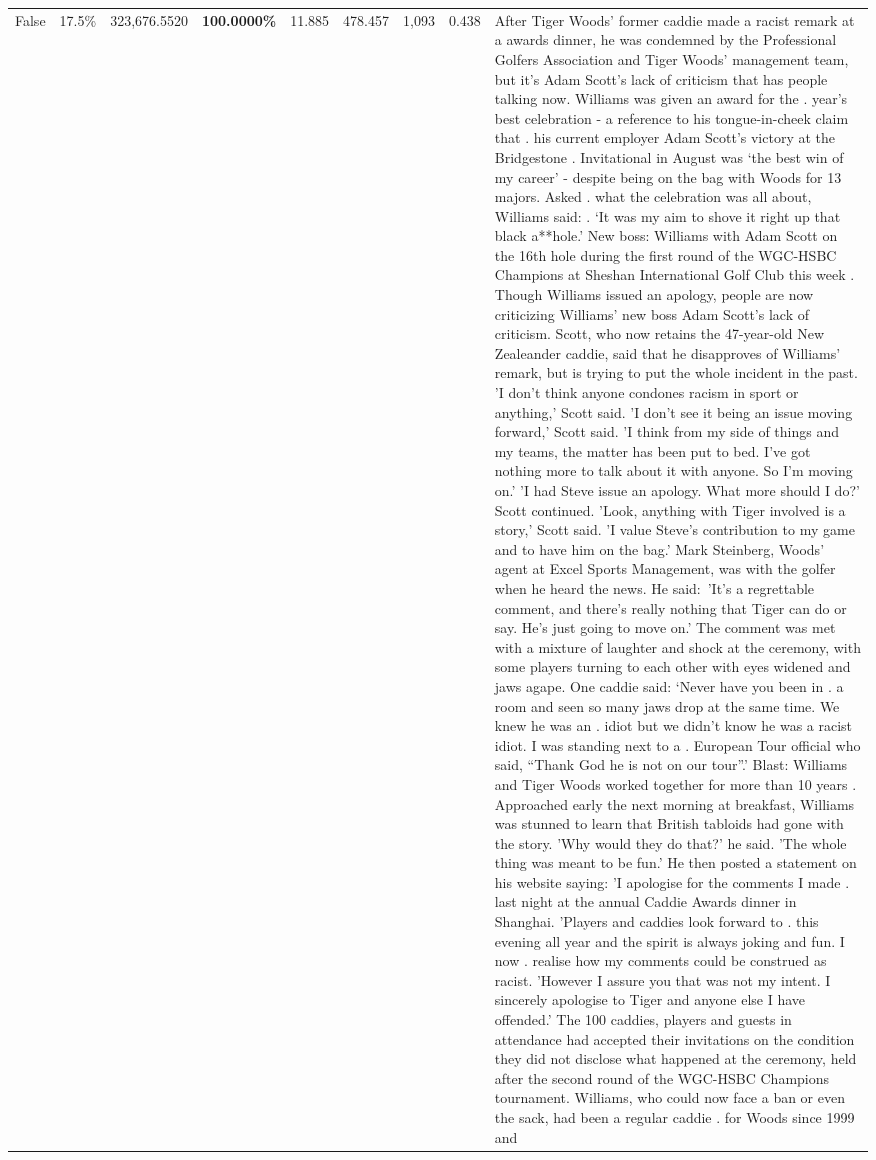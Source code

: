 \begin{table}[H]
\begin{tabular}{lllrlllll}
False & 17.5\% & 323,676.5520 & \bfseries \color{red} 100.0000\% & 11.885 & 478.457 & 1,093 & 0.438 & After Tiger Woods' former caddie made a racist remark at a awards dinner, he was condemned by the Professional Golfers Association and Tiger Woods' management team, but it's Adam Scott's lack of criticism that has people talking now. Williams was given an award for the . year’s best celebration - a reference to his tongue-in-cheek claim that . his current employer Adam Scott’s victory at the Bridgestone . Invitational in August was ‘the best win of my career’ - despite being on the bag with Woods for 13 majors. Asked . what the celebration was all about, Williams said: . ‘It was my aim to shove it right up that black a**hole.’ New boss: Williams with Adam Scott  on the 16th hole during the first round of the WGC-HSBC Champions at Sheshan International Golf Club this week . Though Williams issued an apology, people are now criticizing Williams' new boss Adam Scott's lack of criticism. Scott, who now retains the 47-year-old New Zealeander caddie, said that he disapproves of Williams' remark, but is trying to put the whole incident in the past. 'I don't think anyone condones racism in sport or anything,' Scott said. 'I don't see it being an issue moving forward,' Scott said. 'I think from my side of things and my teams, the matter has been put to bed. I've got nothing more to talk about it with anyone. So I'm moving on.' 'I had Steve issue an apology. What more should I do?' Scott continued. 'Look, anything with Tiger involved is a story,' Scott said. 'I value Steve's contribution to my game and to have him on the bag.' Mark Steinberg, Woods' agent at Excel Sports Management, was with the golfer when he heard the news. He said: 'It's a regrettable comment, and there's really nothing that Tiger can do or say. He's just going to move on.' The comment was met with a mixture of laughter and shock at the ceremony, with some players turning to each other with eyes widened and jaws agape. One caddie said: ‘Never have you been in . a room and seen so many jaws drop at the same time. We knew he was an . idiot but we didn’t know he was a racist idiot. I was standing next to a . European Tour official who said, “Thank God he is not on our tour”.’ Blast: Williams and Tiger Woods worked together for more than 10 years . Approached early the next morning at breakfast, Williams was stunned to learn that British tabloids had gone with the story. 'Why would they do that?' he said. 'The whole thing was meant to be fun.' He then posted a statement on his website saying: 'I apologise for the comments I made . last night at the annual Caddie Awards dinner in Shanghai. 'Players and caddies look forward to . this evening all year and the spirit is always joking and fun. I now . realise how my comments could be construed as racist. 'However I assure you that was not my intent. I sincerely apologise to Tiger and anyone else I have offended.' The 100 caddies, players and guests in attendance had accepted their invitations on the condition they did not disclose what happened at the ceremony, held after the second round of the WGC-HSBC Champions tournament. Williams, who could now face a ban or even the sack, had been a regular caddie . for Woods since 1999 and 
\end{tabular}
\end{table}
